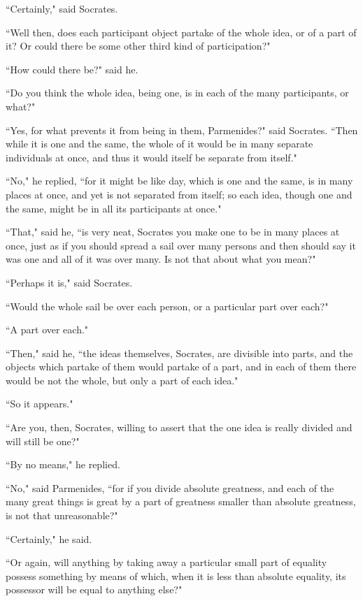 \documentclass[letterpaper,12pt]{article}
\newcommand{\stephpag}[1]{\marginnote{\small\itshape\fontfamily{ppl}\selectfont #1}}
\begin{document}
``Certainly," said Socrates.

``Well then, does each participant object partake of the whole idea, or of a part of it? Or could there be some other third kind of participation?"

``How could there be?" said he.

``Do you think the whole idea, being one, is in each of the many participants, or what?"

``Yes, for what prevents it from being in them, Parmenides?" said Socrates. \stephpag{b} ``Then while it is one and the same, the whole of it would be in many separate individuals at once, and thus it would itself be separate from itself."

``No," he replied, ``for it might be like day, which is one and the same, is in many places at once, and yet is not separated from itself; so each idea, though one and the same, might be in all its participants at once."

``That," said he, ``is very neat, Socrates you make one to be in many places at once, just as if you should spread a sail over many persons and then should say it was one and all of it was over many. \stephpag{c} Is not that about what you mean?"

``Perhaps it is," said Socrates.

``Would the whole sail be over each person, or a particular part over each?"

``A part over each."

``Then," said he, ``the ideas themselves, Socrates, are divisible into parts, and the objects which partake of them would partake of a part, and in each of them there would be not the whole, but only a part of each idea."

``So it appears."

``Are you, then, Socrates, willing to assert that the one idea is really divided and will still be one?"

``By no means," he replied.

``No," said Parmenides, ``for if you divide absolute greatness, \stephpag{d} and each of the many great things is great by a part of greatness smaller than absolute greatness, is not that unreasonable?"

``Certainly," he said.

``Or again, will anything by taking away a particular small part of equality possess something by means of which, when it is less than absolute equality, its possessor will be equal to anything else?"
\end{document}
